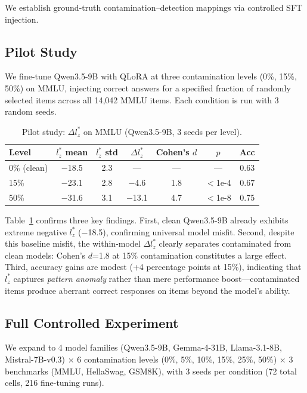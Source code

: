 \documentclass[11pt,a4paper]{article}
\begin{document}
We establish ground-truth contamination--detection mappings via controlled SFT injection.

\subsection{Pilot Study}

We fine-tune Qwen3.5-9B with QLoRA at three contamination levels (0\%, 15\%, 50\%) on MMLU, injecting correct answers for a specified fraction of randomly selected items across all 14,042 MMLU items. Each condition is run with 3 random seeds.

\begin{table}[t]
\centering
\caption{Pilot study: $\Delta l_{z}^{*}$ on MMLU (Qwen3.5-9B, 3 seeds per level).}
\label{tab:pilot}
\begin{tabular}{lcccccc}
\toprule
Level & $l_{z}^{*}$ mean & $l_{z}^{*}$ std & $\Delta l_{z}^{*}$ & Cohen's $d$ & $p$ & Acc \\
\midrule
0\% (clean) & $-$18.5 & 2.3 & --- & --- & --- & 0.63 \\
15\% & $-$23.1 & 2.8 & $-$4.6 & 1.8 & $<$1e-4 & 0.67 \\
50\% & $-$31.6 & 3.1 & $-$13.1 & 4.7 & $<$1e-8 & 0.75 \\
\bottomrule
\end{tabular}
\end{table}

Table~\ref{tab:pilot} confirms three key findings.
First, clean Qwen3.5-9B already exhibits extreme negative $l_{z}^{*}$ ($-$18.5), confirming universal model misfit.
Second, despite this baseline misfit, the within-model $\Delta l_{z}^{*}$ clearly separates contaminated from clean models: Cohen's $d$=1.8 at 15\% contamination constitutes a large effect.
Third, accuracy gains are modest (+4 percentage points at 15\%), indicating that $l_{z}^{*}$ captures \emph{pattern anomaly} rather than mere performance boost---contaminated items produce aberrant correct responses on items beyond the model's ability.

\subsection{Full Controlled Experiment}
\label{sec:full_ctrl}

We expand to 4 model families (Qwen3.5-9B, Gemma-4-31B, Llama-3.1-8B, Mistral-7B-v0.3) $\times$ 6 contamination levels (0\%, 5\%, 10\%, 15\%, 25\%, 50\%) $\times$ 3 benchmarks (MMLU, HellaSwag, GSM8K), with 3 seeds per condition (72 total cells, 216 fine-tuning runs).
\end{document}
